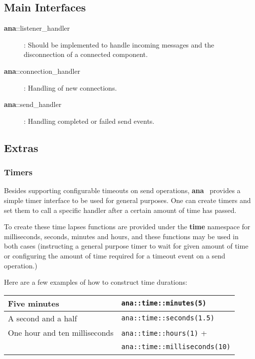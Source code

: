 \documentclass[a4paper,12pt,english]{article}
\newcommand{\ana}{\textbf{ana}}
\begin{document}
\subsection{Main Interfaces}

\begin{description}

\item[\ana::listener\_handler]  :  Should  be  implemented  to  handle
  incoming messages and the disconnection of a connected component.

\item[\ana::connection\_handler]  : Handling  of  new connections.

\item[\ana::send\_handler] : Handling completed or failed send events.

\end{description}

\subsection{Extras}

\subsubsection{Timers}

Besides  supporting  configurable timeouts  on  send operations,  \ana
\ provides a  simple timer interface to be  used for general purposes.
One can create timers and set  them to call a specific handler after a
certain amount of time has passed.

To  create  these  time   lapses  functions  are  provided  under  the
\textbf{time} namespace for  milliseconds, seconds, minutes and hours,
and these functions  may be used in both  cases (instructing a general
purpose  timer to wait  for given  amount of  time or  configuring the
amount of time required for a timeout event on a send operation.)

Here are a few examples of how to construct time durations:
\begin{center}
\begin{tabular}{|l|l|}
  \hline
  Five minutes & \texttt{ana::time::minutes(5)} \\
  \hline
  A second and a half & \texttt{ana::time::seconds(1.5)} \\
  \hline
  One hour and ten milliseconds & \texttt{ana::time::hours(1)} + \\
  \ &     \texttt{ana::time::milliseconds(10)} \\
  \hline
\end{tabular}
\end{center}
\end{document}
